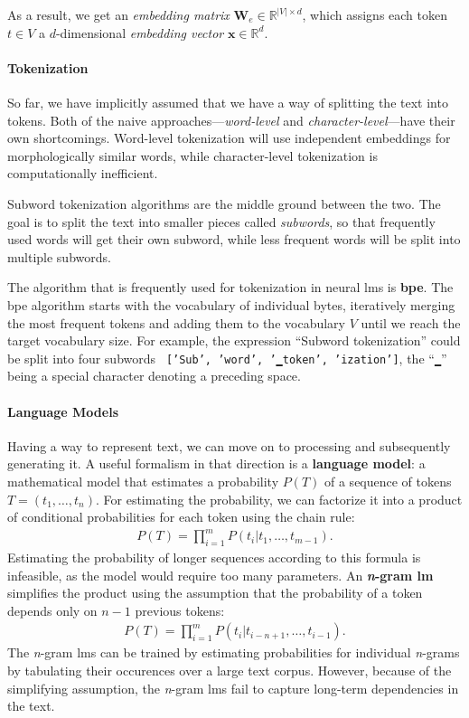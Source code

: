 As a result, we get an \textit{embedding matrix} $\mathbf{W}_e \in \mathbb{R}^{|V|\times d}$, which assigns each token $t \in V$ a $d$-dimensional \textit{embedding vector} $\mathbf{x} \in \mathbb{R}^{d}$.

\paragraph{Tokenization} So far, we have implicitly assumed that we have a way of splitting the text into tokens. Both of the naive approaches---\textit{word-level} and \textit{character-level}---have their own shortcomings. Word-level tokenization will use independent embeddings for morphologically similar words, while character-level tokenization is computationally inefficient.

Subword tokenization algorithms are the middle ground between the two. The goal is to split the text into smaller pieces called \emph{subwords}, so that frequently used words will get their own subword, while less frequent words will be split into multiple subwords.

The algorithm that is frequently used for tokenization in neural \acp{lm} is \textbf{\ac{bpe}}. The \ac{bpe} algorithm starts with the vocabulary of individual bytes, iteratively merging the most frequent tokens and adding them to the vocabulary $V$ until we reach the target vocabulary size. For example, the expression ``Subword tokenization'' could be split into four subwords \texttt{ ['Sub', 'word', '▁token', 'ization']}, the ``\texttt{▁}'' being a special character denoting a preceding space.

\paragraph{Language Models} Having a way to represent text, we can move on to processing and subsequently generating it. A useful formalism in that direction is a \textbf{language model}: a mathematical model that estimates a probability $P(T)$ of a sequence of tokens $T = (t_1, \ldots, t_n)$. For estimating the probability, we can factorize it into a product of conditional probabilities for each token using the chain rule:
\begin{align}
    P(T) = \prod_{i=1}^m P(t_i|t_1, \hdots,t_{m-1}).
\end{align}
Estimating the probability of longer sequences according to this formula is infeasible, as the model would require too many parameters. An \textbf{\emph{n}-gram \ac{lm}} simplifies the product using the assumption that the probability of a token depends only on $n-1$ previous tokens:
\begin{align}
    P(T) = \prod_{i=1}^m P(t_i|t_{i-n+1}, \hdots,t_{i-1}).
\end{align}
The \emph{n}-gram \acp{lm} can be trained by estimating probabilities for individual \emph{n}-grams by tabulating their occurences over a large text corpus. However, because of the simplifying assumption, the \emph{n}-gram \acp{lm} fail to capture long-term dependencies in the text.

